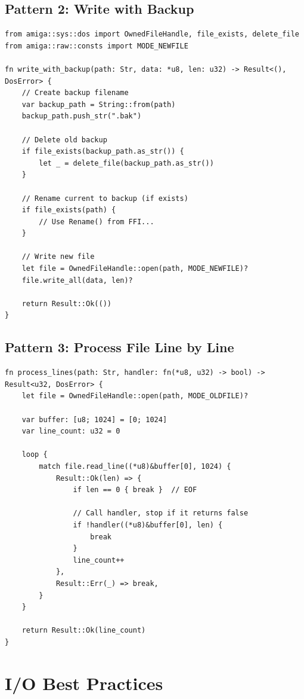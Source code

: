 \subsection{Pattern 2: Write with Backup}

\begin{lstlisting}
from amiga::sys::dos import OwnedFileHandle, file_exists, delete_file
from amiga::raw::consts import MODE_NEWFILE

fn write_with_backup(path: Str, data: *u8, len: u32) -> Result<(), DosError> {
    // Create backup filename
    var backup_path = String::from(path)
    backup_path.push_str(".bak")

    // Delete old backup
    if file_exists(backup_path.as_str()) {
        let _ = delete_file(backup_path.as_str())
    }

    // Rename current to backup (if exists)
    if file_exists(path) {
        // Use Rename() from FFI...
    }

    // Write new file
    let file = OwnedFileHandle::open(path, MODE_NEWFILE)?
    file.write_all(data, len)?

    return Result::Ok(())
}
\end{lstlisting}

\subsection{Pattern 3: Process File Line by Line}

\begin{lstlisting}
fn process_lines(path: Str, handler: fn(*u8, u32) -> bool) -> Result<u32, DosError> {
    let file = OwnedFileHandle::open(path, MODE_OLDFILE)?

    var buffer: [u8; 1024] = [0; 1024]
    var line_count: u32 = 0

    loop {
        match file.read_line((*u8)&buffer[0], 1024) {
            Result::Ok(len) => {
                if len == 0 { break }  // EOF

                // Call handler, stop if it returns false
                if !handler((*u8)&buffer[0], len) {
                    break
                }
                line_count++
            },
            Result::Err(_) => break,
        }
    }

    return Result::Ok(line_count)
}
\end{lstlisting}

\section{I/O Best Practices}
\label{sec:io-best-practices}


